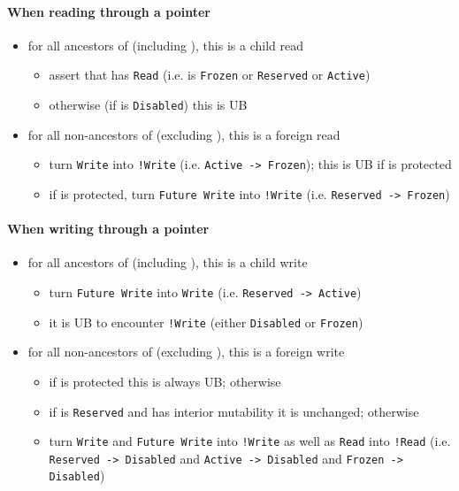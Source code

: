 \documentclass[a4paper,11pt]{article}
\theoremstyle{plain}
\theoremstyle{definition}
\theoremstyle{remark}
\newcommand{\tcode}[1]{\rstinline{#1}}
\newcommand{\tperm}[1]{\texttt{#1}}
\begin{document}
\paragraph*{When reading through a pointer \tcode{y}}
\begin{itemize}
    \item for all ancestors \tcode{x} of \tcode{y} (including \tcode{y}), this is a child read
        \begin{itemize}
            \item assert that \tcode{x} has \tperm{Read} (i.e. is \tperm{Frozen} or \tperm{Reserved} or \tperm{Active})
            \item otherwise (if \tcode{x} is \tperm{Disabled}) this is UB
        \end{itemize}
    \item for all non-ancestors \tcode{z} of \tcode{y} (excluding \tcode{y}), this is a foreign read
        \begin{itemize}
            \item turn \tperm{Write} into \tperm{!Write} (i.e. \tperm{Active -> Frozen}); this is UB if \tcode{z} is protected
            \item if \tcode{z} is protected, turn \tperm{Future Write} into \tperm{!Write} (i.e. \tperm{Reserved -> Frozen})
        \end{itemize}
\end{itemize}

\paragraph*{When writing through a pointer \tcode{y}}
\begin{itemize}
    \item for all ancestors \tcode{x} of \tcode{y} (including \tcode{y}), this is a child write
        \begin{itemize}
            \item turn \tperm{Future Write} into \tperm{Write} (i.e. \tperm{Reserved -> Active})
            \item it is UB to encounter \tperm{!Write} (either \tperm{Disabled} or \tperm{Frozen})
        \end{itemize}
    \item for all non-ancestors \tcode{z} of \tcode{y} (excluding \tcode{y}), this is a foreign write
        \begin{itemize}
            \item if \tcode{z} is protected this is always UB; otherwise
            \item if \tcode{z} is \tperm{Reserved} and has interior mutability it is unchanged; otherwise
            \item turn \tperm{Write} and \tperm{Future Write} into \tperm{!Write} as well as \tperm{Read} into \tperm{!Read}
                (i.e. \tperm{Reserved -> Disabled} and \tperm{Active -> Disabled} and \tperm{Frozen -> Disabled})
        \end{itemize}
\end{itemize}
\end{document}
